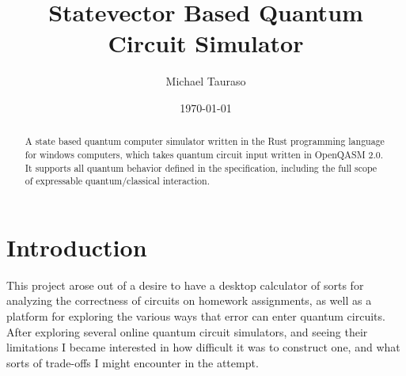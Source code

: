 \documentclass[%
 reprint,
 amsmath,amssymb,
 aps,
]{revtex4-2}
\begin{document}

\title{Statevector Based Quantum Circuit Simulator}
\author{Michael Tauraso}
%


%

\date{\today}%

\begin{abstract}
A state based quantum computer simulator written in the Rust programming language for windows computers, which takes quantum circuit input written in OpenQASM 2.0. It supports all quantum behavior defined in the specification, including the full scope of expressable quantum/classical interaction.\end{abstract}

\maketitle




\section{\label{sec:level1}Introduction}
This project arose out of a desire to have a desktop calculator of sorts for analyzing the correctness of circuits on homework assignments, as well as a platform for exploring the various ways that error can enter quantum circuits. After exploring several online quantum circuit simulators, and seeing their limitations I became interested in how difficult it was to construct one, and what sorts of trade-offs I might encounter in the attempt.
\end{document}
